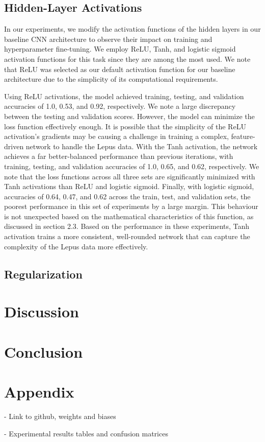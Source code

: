 \documentclass{article}
\begin{document}
\subsection{Hidden-Layer Activations}
In our experiments, we modify the activation functions of the hidden layers in our baseline CNN architecture to observe their impact on training and hyperparameter fine-tuning. We employ ReLU, Tanh, and logistic sigmoid activation functions for this task since they are among the most used. We note that ReLU was selected as our default activation function for our baseline architecture due to the simplicity of its computational requirements.

Using ReLU activations, the model achieved training, testing, and validation accuracies of 1.0, 0.53, and 0.92, respectively. We note a large discrepancy between the testing and validation scores. However, the model can minimize the loss function effectively enough. It is possible that the simplicity of the ReLU activation’s gradients may be causing a challenge in training a complex, feature-driven network to handle the Lepus data. With the Tanh activation, the network achieves a far better-balanced performance than previous iterations, with training, testing, and validation accuracies of 1.0, 0.65, and 0.62, respectively. We note that the loss functions across all three sets are significantly minimized with Tanh activations than ReLU and logistic sigmoid. Finally, with logistic sigmoid, accuracies of 0.64, 0.47, and 0.62 across the train, test, and validation sets, the poorest performance in this set of experiments by a large margin. This behaviour is not unexpected based on the mathematical characteristics of this function, as discussed in section 2.3. Based on the performance in these experiments, Tanh activation trains a more consistent, well-rounded network that can capture the complexity of the Lepus data more effectively.


\subsection{Regularization}



\section{Discussion}
\section{Conclusion}







\medskip


\appendix

\section{Appendix}

- Link to github, weights and biases

- Experimental results tables and confusion matrices
\end{document}
